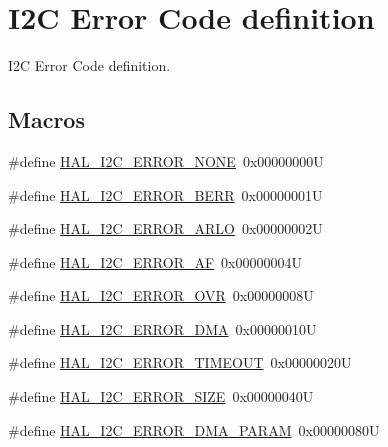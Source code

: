 \hypertarget{group___i2_c___error___code__definition}{}\section{I2C Error Code definition}
\label{group___i2_c___error___code__definition}


I2C Error Code definition.  


\subsection*{Macros}
\begin{DoxyCompactItemize}
\item 
\#define \hyperlink{group___i2_c___error___code__definition_ga0b8ca289091d942032c89484b6211d0d}{H\+A\+L\+\_\+\+I2\+C\+\_\+\+E\+R\+R\+O\+R\+\_\+\+N\+O\+NE}~0x00000000U
\item 
\#define \hyperlink{group___i2_c___error___code__definition_gab9f6e39431ee764ada50fd63f0ad2fbf}{H\+A\+L\+\_\+\+I2\+C\+\_\+\+E\+R\+R\+O\+R\+\_\+\+B\+E\+RR}~0x00000001U
\item 
\#define \hyperlink{group___i2_c___error___code__definition_ga048b36222884bfe80ce2d37fa868690b}{H\+A\+L\+\_\+\+I2\+C\+\_\+\+E\+R\+R\+O\+R\+\_\+\+A\+R\+LO}~0x00000002U
\item 
\#define \hyperlink{group___i2_c___error___code__definition_gad1cc236ad6ba5cafe66aecb0dbedc65a}{H\+A\+L\+\_\+\+I2\+C\+\_\+\+E\+R\+R\+O\+R\+\_\+\+AF}~0x00000004U
\item 
\#define \hyperlink{group___i2_c___error___code__definition_ga38d8f9beb4c681eba786f6154d4f594a}{H\+A\+L\+\_\+\+I2\+C\+\_\+\+E\+R\+R\+O\+R\+\_\+\+O\+VR}~0x00000008U
\item 
\#define \hyperlink{group___i2_c___error___code__definition_gae1091e9e82dcfcfef247b214a11c9db3}{H\+A\+L\+\_\+\+I2\+C\+\_\+\+E\+R\+R\+O\+R\+\_\+\+D\+MA}~0x00000010U
\item 
\#define \hyperlink{group___i2_c___error___code__definition_gaeb3bedf36d78ddf3284a68494ab9d089}{H\+A\+L\+\_\+\+I2\+C\+\_\+\+E\+R\+R\+O\+R\+\_\+\+T\+I\+M\+E\+O\+UT}~0x00000020U
\item 
\#define \hyperlink{group___i2_c___error___code__definition_ga98027ff2d2fda2c793b07168ded747a4}{H\+A\+L\+\_\+\+I2\+C\+\_\+\+E\+R\+R\+O\+R\+\_\+\+S\+I\+ZE}~0x00000040U
\item 
\#define \hyperlink{group___i2_c___error___code__definition_gacb922e1386469dce306f548cfd5c1277}{H\+A\+L\+\_\+\+I2\+C\+\_\+\+E\+R\+R\+O\+R\+\_\+\+D\+M\+A\+\_\+\+P\+A\+R\+AM}~0x00000080U
\end{DoxyCompactItemize}


